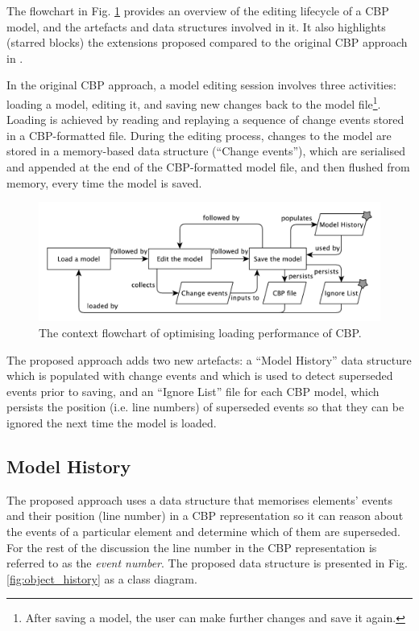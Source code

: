 \documentclass[12pt, a4paper]{report} \usepackage[titletoc]{appendix}
\begin{document}
The flowchart in Fig. \ref{fig:flowchart} provides an overview of the editing lifecycle of a CBP model, and the artefacts and data structures involved in it. It also highlights (starred blocks) the extensions proposed compared to the original CBP approach in \cite{yohannis2017turning}.

In the original CBP approach, a model editing session involves three activities: loading a model, editing it, and saving new changes back to the model file\footnote{After saving a model, the user can make further changes and save it again.}. Loading is achieved by reading and replaying a sequence of change events stored in a CBP-formatted file. During the editing process, changes to the model are stored in a memory-based data structure (``Change events''), which are serialised and appended at the end of the CBP-formatted model file, and then flushed from memory, every time the model is saved.

\begin{figure}[ht]
	\centering
	\includegraphics[width=\linewidth]{flowchart}
	\caption{The context flowchart of optimising loading performance of CBP.}
	\label{fig:flowchart}
\end{figure}

The proposed approach adds two new artefacts: a ``Model History'' data structure which is populated with change events and which is used to detect superseded events prior to saving, and an ``Ignore List'' file for each CBP model, which persists the position (i.e. line numbers) of superseded events so that they can be ignored the next time the model is loaded.

\subsection{Model History}
\label{subsec:model_history}
The proposed approach uses a data structure that memorises elements' events and their position (line number) in a CBP representation so it can reason about the events of a particular element and determine which of them are superseded. For the rest of the discussion the line number in the CBP representation is referred to as the \emph{event number}. The proposed data structure is presented in Fig. \ref{fig:object_history} as a class diagram.  
\end{document}
